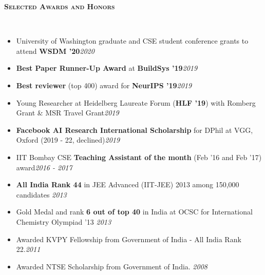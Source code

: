 \documentclass[10pt]{article}
\renewcommand{\section}[1]{
\bigskip
  \begin{Large}
  {\textsc{\textbf{#1}}}
  \end{Large}
  \hrulefill
  \medskip
  \\
}
\newenvironment{midlist}[1][\enskip\textbullet]%
        {\begin{itemize}[#1,leftmargin=*,parsep=0pt,itemsep=4pt,topsep=0pt,partopsep=0pt]}
        {\end{itemize}}
\begin{document}
\section{Selected Awards and Honors}
\vspace{-3mm}
\begin{midlist}
\item University of Washington graduate and CSE student conference grants to attend \textbf{WSDM '20}\hfill{\textit{2020}}
\item \textbf{Best Paper Runner-Up Award} at \textbf{BuildSys '19}\hfill{\textit{2019}}
\item \textbf{Best reviewer} (top 400) award for \textbf{NeurIPS '19}\hfill{\textit{2019}}
\item Young Researcher at Heidelberg Laureate Forum (\textbf{HLF '19}) with Romberg Grant \& MSR Travel Grant\hfill{\textit{2019}}
\item \textbf{Facebook AI Research International Scholarship} for DPhil at VGG, Oxford (2019 - 22, declined)\hfill{\textit{2019}}
\item IIT Bombay CSE \textbf{Teaching Assistant of the month} (Feb '16 and Feb '17) award\hfill{\textit{2016 - 2017}}
\item \textbf{All India Rank 44} in JEE Advanced (IIT-JEE) 2013 among 150,000 candidates \hfill{\textit{2013}}
\item  Gold Medal and rank \textbf{6 out of top 40} in India at OCSC for International Chemistry Olympiad '13 \hfill{\textit{2013}}
\item Awarded KVPY Fellowship from Government of India - All India Rank 22.\hfill{\textit{2011}}
\item Awarded NTSE Scholarship from Government of India. \hfill{\textit{2008}}
\end{midlist}
\end{document}
